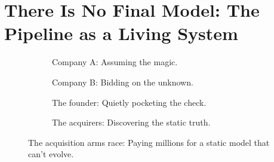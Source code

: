 \section{There Is No Final Model: The Pipeline as a Living System}

\begin{figure}[H]
  \centering
  
  \begin{subfigure}[t]{0.45\textwidth}
  \centering
  \caption*{Company A: Assuming the magic.}
  \end{subfigure}
  \hfill
  \begin{subfigure}[t]{0.45\textwidth}
  \centering
  \caption*{Company B: Bidding on the unknown.}
  \end{subfigure}
  
  \vspace{1em}
  
  \begin{subfigure}[t]{0.45\textwidth}
  \centering
  \caption*{The founder: Quietly pocketing the check.}
  \end{subfigure}
  \hfill
  \begin{subfigure}[t]{0.45\textwidth}
  \centering
  \caption*{The acquirers: Discovering the static truth.}
  \end{subfigure}
  
  \caption{The acquisition arms race: Paying millions for a static model that can't evolve.}
  \end{figure}
  


